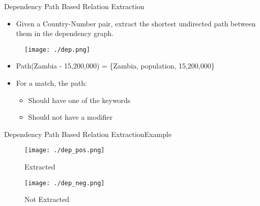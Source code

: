 \documentclass{beamer}
\begin{document}
\begin{frame}{Dependency Path Based Relation Extraction}
 
\begin{itemize}
 \item Given a Country-Number pair, extract the shortest undirected path between them in the dependency graph.
\end{itemize}
 \begin{figure}[h]
 \centering
 \texttt{[image: ./dep.png]}
\end{figure}
\begin{itemize}
 \item Path(Zambia - 15,200,000) = \{Zambia, population, 15,200,000\}
  \item For a match, the path:
  \begin{itemize}
   \item Should have one of the keywords
   \item Should not have a modifier
  \end{itemize}
 \end{itemize}
\end{frame}

\begin{frame}{Dependency Path Based Relation Extraction}{Example}
\begin{figure}[h]
 \centering
 \texttt{[image: ./dep\_pos.png]}
 \caption*{Extracted}
\end{figure}
\begin{figure}[h]
 \centering
 \texttt{[image: ./dep\_neg.png]}
 \caption*{Not Extracted}
\end{figure}

\end{frame}
\end{document}
